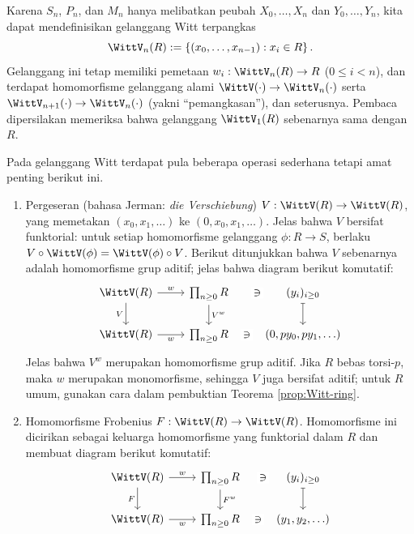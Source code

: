 Karena $S_n$, $P_n$, dan $M_n$ hanya melibatkan peubah $X_0, \ldots, X_n$ dan $Y_0, \ldots, Y_n$, kita dapat mendefinisikan gelanggang Witt terpangkas 
\[ \WittV_n(R)  := \left\{ (x_0, \ldots, x_{n-1}) : x_i \in R \right\}. \]
Gelanggang ini tetap memiliki pemetaan $w_i: \WittV_n(R) \to R$ ($0 \leq i < n$), dan terdapat homomorfisme gelanggang alami $\WittV(\cdot) \to \WittV_n(\cdot)$ serta $\WittV_{n+1}(\cdot) \to \WittV_n(\cdot)$ (yakni ``pemangkasan''), dan seterusnya. Pembaca dipersilakan memeriksa bahwa gelanggang $\WittV_1(R)$ sebenarnya sama dengan $R$.

Pada gelanggang Witt terdapat pula beberapa operasi sederhana tetapi amat penting berikut ini.
\begin{enumerate}
	\item Pergeseran (bahasa Jerman: \textit{die Verschiebung}) $V: \WittV(R) \to \WittV(R)$, yang memetakan $(x_0, x_1, \ldots)$ ke $(0, x_0, x_1, \ldots)$. Jelas bahwa $V$ bersifat funktorial: untuk setiap homomorfisme gelanggang $\phi: R \to S$, berlaku $V \circ \WittV(\phi) = \WittV(\phi) \circ V$. Berikut ditunjukkan bahwa $V$ sebenarnya adalah homomorfisme grup aditif; jelas bahwa diagram berikut komutatif:
		\[\begin{tikzcd}
			\WittV(R) \arrow[r, "w"] \arrow[d, "V"'] & \prod_{n \geq 0} R \arrow[d, "{V^w}"] & (y_i)_{i \geq 0} \arrow[phantom, l, "\ni" description] \arrow[mapsto, d] \\
			\WittV(R) \arrow[r, "w"'] & \prod_{n \geq 0} R & (0, py_0, py_1, \ldots) \arrow[phantom, l, "\ni" description]
		\end{tikzcd}\]
		Jelas bahwa $V^w$ merupakan homomorfisme grup aditif. Jika $R$ bebas torsi-$p$, maka $w$ merupakan monomorfisme, sehingga $V$ juga bersifat aditif; untuk $R$ umum, gunakan cara dalam pembuktian Teorema \ref{prop:Witt-ring}.
	\item Homomorfisme Frobenius $F: \WittV(R) \to \WittV(R)$. Homomorfisme ini dicirikan sebagai keluarga homomorfisme yang funktorial dalam $R$ dan membuat diagram berikut komutatif:
		\[\begin{tikzcd}
			\WittV(R) \arrow[r, "w"] \arrow[d, "F"'] & \prod_{n \geq 0} R \arrow[d, "{F^w}"] & (y_i)_{i \geq 0} \arrow[phantom, l, "\ni" description] \arrow[mapsto, d] \\
			\WittV(R) \arrow[r, "w"'] & \prod_{n \geq 0} R & (y_1, y_2, \ldots) \arrow[phantom, l, "\ni" description]
		\end{tikzcd} \]

\end{enumerate}
